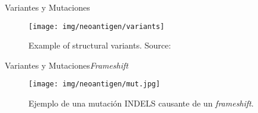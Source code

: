 \documentclass[10pt]{beamer}
\newcommand{\1}{
	\setbeamertemplate{background}{
		\texttt{[image: img/1]}
		\tikz[overlay] \fill[fill opacity=0.75,fill=white] (0,0) rectangle (-\paperwidth,\paperheight);
	}
}
\begin{document}


\begin{frame}{Variantes y Mutaciones}{}
	\begin{figure}[h]
		\centering
		\texttt{[image: img/neoantigen/variants]}
		\caption{Example of structural variants. Source: \cite{sv_pacbio_2021}}
		\label{fig:variants}
	\end{figure}	
\end{frame}

\begin{frame}{Variantes y Mutaciones}{\textit{Frameshift}}
	\begin{figure}[]
		\centering
		\texttt{[image: img/neoantigen/mut.jpg]}
		\caption{Ejemplo de una mutación INDELS causante de un \textit{frameshift}.}
	\end{figure}
\end{frame}
\end{document}
